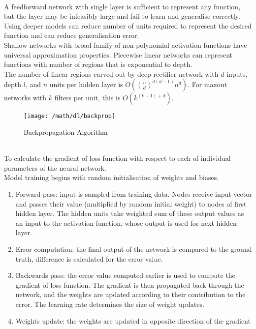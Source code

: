 \begin{remark} \\
A feedforward network with single layer is sufficient to represent any function, but the layer may be infeasibly large and fail to learn and generalise correctly. Using deeper models can reduce number of units required to represent the desired function and can reduce generalisation error.\\
Shallow networks with broad family of non-polynomial activation functions have universal approximation properties. Piecewise linear networks can represent functions with number of regions that is exponential to depth.\\
The number of linear regions carved out by deep rectifier network with $d$ inputs, depth $l$, and $n$ units per hidden layer is $O(\binom{n}{d}^{d(d-1)} n^d)$. For maxout networks with $k$ filters per unit, this is $O(k^{(k-1)+d})$.
\end{remark}

\begin{figure}[H]
\centering
\texttt{[image: /math/dl/backprop]}
\caption{Backpropagation Algorithm}
\end{figure}

\begin{remark} \\
To calculate the gradient of loss function with respect to each of individual parameters of the neural network.\\
Model training begins with random initialisation of weights and biases.
\begin{enumerate}[label=\roman*.]
\setlength{\itemsep}{0pt}
\item Forward pass: input is sampled from training data. Nodes receive input vector and passes their value (multiplied by random initial weight) to nodes of first hidden layer. The hidden units take weighted sum of these output values as an input to the activation function, whose output is used for next hidden layer.
\item Error computation: the final output of the network is compared to the ground truth, difference is calculated for the error value.
\item Backwards pass: the error value computed earlier is used to compute the gradient of loss function. The gradient is then propagated back through the network, and the weights are updated according to their contribution to the error. The learning rate determines the size of weight updates.
\item Weights update: the weights are updated in opposite direction of the gradient
\end{enumerate}
\end{remark}


